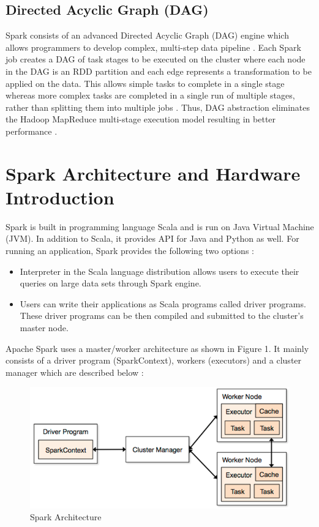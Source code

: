 \documentclass[sigconf]{acmart}
\begin{document}
\subsection{Directed Acyclic Graph (DAG)} 
Spark consists of an advanced Directed Acyclic Graph (DAG) engine which allows programmers to develop complex, multi-step data pipeline \cite{spark-a1}. Each Spark job creates a DAG of task stages to be executed on the cluster where each node in the DAG is an RDD partition and each edge represents a transformation to be applied on the data. This allows simple tasks to complete in a single stage whereas more complex tasks are completed in a single run of multiple stages, rather than splitting them into multiple jobs \cite{verma2016big-p3}. Thus, DAG abstraction eliminates the Hadoop MapReduce multi-stage execution model resulting in better performance \cite{spark-a2}.

\section{Spark Architecture and Hardware Introduction}
Spark is built in programming language Scala and is run on Java Virtual Machine (JVM). In addition to Scala, it provides API for Java and Python as well. For running an application, Spark provides the following two options \cite{verma2016big-p3}:
\begin{itemize}
	\item Interpreter in the Scala language distribution allows users to execute their queries on large data sets through Spark engine. 
	\item Users can write their applications as Scala programs called driver programs. These driver programs can be then compiled and submitted to the cluster's master node.
\end{itemize}

Apache Spark uses a master/worker architecture as shown in Figure 1. It mainly consists of a driver program (SparkContext), workers (executors) and a cluster manager which are described below \cite{spark-a2}: 

\begin{figure}
\includegraphics[width=\columnwidth]{images/spark-architecture}
\caption{Spark Architecture \cite{img-arch}}
\label{Figure 1}
\end{figure}
\end{document}
